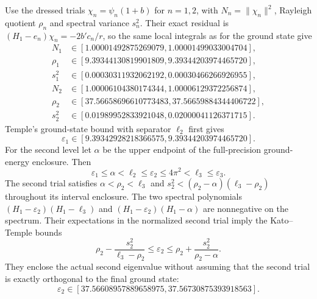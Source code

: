 \documentclass[aps,pra,reprint,superscriptaddress,longbibliography]{revtex4-2}
\begin{document}
Use the dressed trials $\chi_n=\psi_n(1+b)$ for $n=1,2$, with
$N_n=\|\chi_n\|^2$, Rayleigh quotient $\rho_n$ and spectral
variance $s_n^2$.  Their exact residual is
$(H_1-e_n)\chi_n=-2b'c_n/r$, so the same local integrals as for
the ground state give
\begin{align}
 N_1&\in[1.00001492875269079,1.00001499033004704],\nonumber\\
 \rho_1&\in[9.39344130819901809,9.39344203974465720],\nonumber\\
 s_1^2&\in[0.00030311932062192,0.00030466266926955],\nonumber\\
 N_2&\in[1.00006104380174344,1.00006129372256874],\nonumber\\
 \rho_2&\in[37.56658696610773483,37.56659884344406722],\nonumber\\
 s_2^2&\in[0.01989952833921048,0.02000041126371715].
 \label{eq:nc-prep-trial}
\end{align}
Temple's ground-state bound with separator $\ell_2$ first gives
\begin{equation}
 \varepsilon_1\in
 [9.39342928218366575,9.39344203974465720].
 \label{eq:nc-prep-ground}
\end{equation}
For the second level let $\alpha$ be the upper endpoint of the
full-precision ground-energy enclosure.  Then
\[
 \varepsilon_1\le\alpha<\ell_2\le\varepsilon_2
                  \le4\pi^2<\ell_3\le\varepsilon_3.
\]
The second trial satisfies $\alpha<\rho_2<\ell_3$ and
$s_2^2<(\rho_2-\alpha)(\ell_3-\rho_2)$ throughout its
interval enclosure.  The two spectral polynomials
$(H_1-\varepsilon_2)(H_1-\ell_3)$ and
$(H_1-\varepsilon_2)(H_1-\alpha)$ are nonnegative on the
spectrum.  Their expectations in the normalized second trial imply
the Kato--Temple bounds~\cite{Temple,KatoBounds}
\begin{equation}
 \rho_2-\frac{s_2^2}{\ell_3-\rho_2}
 \le\varepsilon_2\le
 \rho_2+\frac{s_2^2}{\rho_2-\alpha}.
 \label{eq:nc-kato-temple}
\end{equation}
They enclose the actual second eigenvalue without assuming that the
second trial is exactly orthogonal to the final ground state:
\begin{equation}
 \varepsilon_2\in
 [37.56608957889658975,37.56730875393918563].
 \label{eq:nc-prep-second}
\end{equation}
\end{document}
